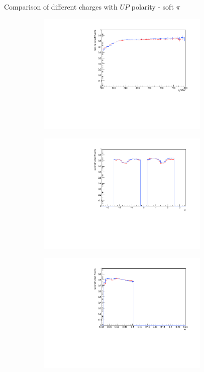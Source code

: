 \documentclass[11pt]{beamer}
\begin{document}
\begin{frame}{Comparison of different charges with $UP$ polarity - soft $\pi$}
\begin{figure}
\begin{subfigure}{0.45\textwidth}
\includegraphics[width=0.9\textwidth]{sec/up_pdf/combined/h_pt_reco_SPi.pdf}
\end{subfigure}
\begin{subfigure}{0.45\textwidth}
\includegraphics[width=0.9\textwidth]{sec/up_pdf/combined/h_phi_reco_SPi.pdf}
\end{subfigure}
\begin{subfigure}{0.45\textwidth}
\includegraphics[width=0.9\textwidth]{sec/up_pdf/combined/h_theta_reco_SPi.pdf}

\end{subfigure}
\end{figure}
\end{frame}
\end{document}
